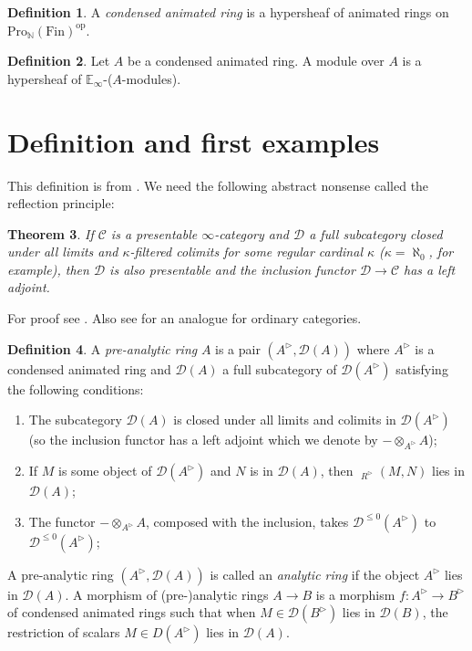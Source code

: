 \documentclass{article}
\theoremstyle{plain}
\newtheorem{thm}{Theorem}
\theoremstyle{definition}
\newtheorem{defi}[thm]{Definition}
\theoremstyle{remark}
\DeclareMathOperator{\rhoms}{\underline{RHom}}
\newcommand{\huflag}{\triangleright}
\newcommand{\D}{\mathcal{D}}
\begin{document}
\begin{defi}
A \emph{condensed animated ring} is a hypersheaf of animated rings on $ \mathrm{Pro}_{\mathbb{N}}(\mathrm{Fin})^{\mathrm{op}} $.
\end{defi}

\begin{defi}
Let $ A $ be a condensed animated ring. A module over $ A $ is a hypersheaf of $ \mathbb{E}_{\infty} $-($ A $-modules).
\end{defi}

\section{Definition and first examples}
This definition is from \cite[\href
{https://www.youtube.com/watch?v=YxSZ1mTIpaA\&list=PLx5f8IelFRgGmu6gmL-Kf\_Rl\_6Mm7juZO\&t=3962s}{Video 1, 1:06:02}]{ihesvid}.
We need the following abstract nonsense called the reflection principle:
\begin{thm}
If $ \mathcal{C} $ is a presentable $ \infty $-category and $ \mathcal{D} $ a full subcategory closed under all limits and $ \kappa $-filtered colimits
for some regular cardinal $ \kappa $ ($ \kappa = \aleph _{0} $, for example),
then $ \mathcal{D} $ is also presentable and the inclusion functor $ \mathcal{D}\to \mathcal{C} $ has a left adjoint.
\end{thm}

For proof see \cite{ragimov_infty-categorical_2022}. Also see \cite{adamek_reflections_1989} for an analogue for ordinary categories.

\begin{defi}
A \emph{pre-analytic ring} $ A $ is a pair $ (A ^{\huflag}, \D(A)) $ where $ A ^{\huflag} $ is a condensed animated ring and
$ \D (A) $ a full subcategory of $ \D (A ^{\huflag}) $ satisfying the following conditions:

\begin{enumerate}
\item The subcategory $ \D (A) $ is closed under all limits and colimits in $ \D (A ^{\huflag}) $ 
(so the inclusion functor has a left adjoint which we denote by $ - \otimes _{A ^{\huflag}} A $);
\item If $ M $ is some object of $ \D (A ^{\huflag}) $ and $ N $ is in $\D (A) $, then $ \rhoms _{R ^{\huflag}} (M, N) $ lies in $ \D (A) $;
\item The functor $ -\otimes _{A ^{\huflag}} A $, composed with the inclusion, takes $ \D ^{\leq 0}(A ^{\huflag}) $ to $ \D ^{\leq 0}(A ^{\huflag}) $;
\end{enumerate}
A pre-analytic ring $ (A ^{\huflag}, \D (A)) $ is called an \emph{analytic ring} if
the object $ A ^{\huflag} $ lies in $ \D (A) $.
A morphism of (pre-)analytic rings $ A\to B $ is a morphism $ f: A ^{\huflag}\to B ^{\huflag} $ of condensed animated rings such that when
$ M\in \D (B ^{\huflag}) $ lies in $ \D (B) $, the restriction of scalars $ M \in D (A ^{\huflag}) $ lies in $ \D (A) $.
\end{defi}
\end{document}
